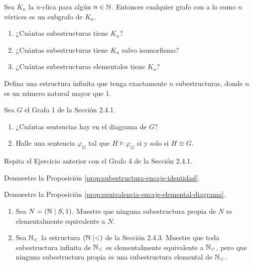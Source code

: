 \message{ !name(main.tex)}\documentclass[12pt,a4paper]{book}
\begin{document}
    \begin{ejercicio}
        Sea $K_{n}$ la $n$-clica para algún $n\in\mathbb{N}$. Entonces cualquier grafo con a lo sumo $n$ vértices es un subgrafo
        de $K_{n}$.
        \begin{enumerate}[label=(\alph*)]
            \item ¿Cuántas subestructuras tiene $K_{n}$?
            \item ¿Cuántas subestructuras tiene $K_{n}$ salvo isomorfismo?
            \item ¿Cuántas subestructuras elementales tiene $K_{n}$?
        \end{enumerate}
    \end{ejercicio}

    \begin{ejercicio}
        Defina una estructura infinita que tenga exactamente $n$ subestructuras, donde $n$ es un número natural mayor
        que 1.
    \end{ejercicio}

    \begin{ejercicio}
        Sea $G$ el Grafo 1 de la Sección 2.4.1.
        \begin{enumerate}[label=(\alph*)]
            \item ¿Cuántas sentencias hay en el diagrama de $G$?
            \item Halle una sentencia $\varphi_{G}$ tal que $H\models\varphi_{G}$ si y solo si $H\cong G$.
        \end{enumerate}
    \end{ejercicio}

    \begin{ejercicio}
        Repita el Ejercicio anterior con el Grafo 4 de la Sección 2.4.1.
    \end{ejercicio}

    \begin{ejercicio}\label{ej:subestructura-encaje-identidad-completa}
        Demuestre la Proposición \ref{prop:subestructura-encaje-identidad}.
    \end{ejercicio}

    \begin{ejercicio}\label{ej:diagrama-elemental-completa}
        Demuestre la Proposición \ref{prop:equivalencia-encaje-elemental-diagrama}.
    \end{ejercicio}

    \begin{ejercicio}
        \begin{enumerate}[label=(\alph*)]
            \item Sea $N=(\mathbb{N}\mid S,1)$. Muestre que ninguna subestructura propia de $N$ es elementalmente equivalente a
            $N$.
            \item Sea $\mathbb{N}_{<}$ la estructura $(\mathbb{N}\mid<)$ de la Sección 2.4.3. Muestre que toda subestructura infinita de
            $\mathbb{N}_{<}$ es elementalmente equivalente a $\mathbb{N}_{<}$, pero que ninguna subestructura propia es una subestructura
            elemental de $\mathbb{N}_{<}$.
        \end{enumerate}
    \end{ejercicio}
\end{document}
